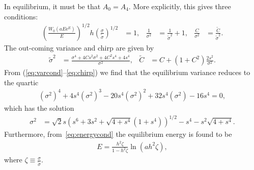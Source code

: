 In equilibrium, it must be that $A_0 = A_4$. More explicitly, this gives three conditions:
\begin{align}
\label{eq:energycond}
	\left( \frac{W_0(a E \textrm{e}^E)}{E} \right)^{1/2} h \left( \frac{\sigma}{\widetilde{\sigma}} \right)^{1/2} &= 1,& \frac{1}{\sigma^2} &= \frac{1}{\widetilde{\sigma}^2} + 1,& \frac{C}{\sigma^2} &= \frac{\widetilde{C}}{\widetilde{\sigma}^2}.
\end{align}
The out-coming variance and chirp are given by \cite{agrawal2013}
\begin{align}
\label{eq:variance}
	\widetilde{\sigma}^2 &= \frac{\sigma^4 + 4 C s^2 \sigma^2 + 4 C^2 s^4 +4s^4}{\sigma^2},& \widetilde{C} &= C + \left( 1 + C^2 \right) \frac{2s^2}{\sigma^2}.
\end{align}
From (\ref{eq:varcond}--\ref{eq:chirp}) we find that the equilibrium variance reduces to the quartic
\begin{align*}
\left( \sigma^2 \right)^4 + 4 s^4 \left( \sigma^2 \right)^3 - 20 s^4 \left( \sigma^2 \right)^2 + 32 s^4 \left( \sigma^2 \right) - 16 s^4 = 0,
\end{align*}
which has the solution
\begin{align*}
\sigma^2 &= \sqrt{2} s \left( s^6 + 3s^2 + \sqrt{4 + s^4}(1 + s^4) \right)^{1/2} - s^4 - s^2 \sqrt{4 + s^4}.
\end{align*}
Furthermore, from~\eqref{eq:energycond} the equilibrium energy is found to be
\begin{align}
	\label{eq:equilenergy}
	E = \frac{h^2 \zeta}{1 - h^2 \zeta} \ln \left( a h^2 \zeta \right),
\end{align}
where $\displaystyle \zeta \equiv \frac{\sigma}{\widetilde{\sigma}}$.
